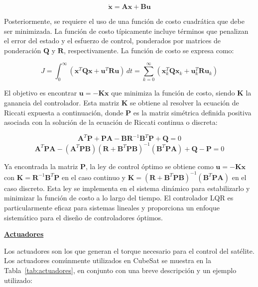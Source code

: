 \[
\dot{\mathbf{x}} = \mathbf{A} \mathbf{x} + \mathbf{B} \mathbf{u}
\]

Posteriormente, se requiere el uso de una función de costo cuadrática que debe ser minimizada. La función de costo típicamente incluye términos que penalizan el error del estado y el esfuerzo de control, ponderados por matrices de ponderación \( \mathbf{Q} \) y \( \mathbf{R} \), respectivamente. La función de costo se expresa como:

\[
J = \int_{0}^{\infty} \left( \mathbf{x}^T \mathbf{Q} \mathbf{x} + \mathbf{u}^T \mathbf{R} \mathbf{u} \right) \, dt = \sum_{k=0}^{\infty} \left( \mathbf{x}_k^T \mathbf{Q} \mathbf{x}_k + \mathbf{u}_k^T \mathbf{R} \mathbf{u}_k \right)
\]

El objetivo es encontrar \( \mathbf{u} = -\mathbf{K} \mathbf{x} \) que minimiza la función de costo, siendo \( \mathbf{K} \) la ganancia del controlador. Esta matriz \( \mathbf{K} \) se obtiene al resolver la ecuación de Riccati expuesta a continuación, donde \( \mathbf{P} \) es la matriz simétrica definida positiva asociada con la solución de la ecuación de Riccati continua o discreta:

\[
\mathbf{A}^T \mathbf{P} + \mathbf{P} \mathbf{A} - \mathbf{B} \mathbf{R}^{-1} \mathbf{B}^T \mathbf{P} + \mathbf{Q} = 0
\]
\[
\mathbf{A}^T \mathbf{P} \mathbf{A} - (\mathbf{A}^T \mathbf{P} \mathbf{B})(\mathbf{R} + \mathbf{B}^T \mathbf{P} \mathbf{B})^{-1}(\mathbf{B}^T \mathbf{P} \mathbf{A}) + \mathbf{Q} - \mathbf{P} = 0
\]

Ya encontrada la matriz \( \mathbf{P} \), la ley de control óptimo se obtiene como \( \mathbf{u} = -\mathbf{K} \mathbf{x} \) con \( \mathbf{K} = \mathbf{R}^{-1} \mathbf{B}^T \mathbf{P} \) en el caso continuo y \( \mathbf{K} = (\mathbf{R}+ \mathbf{B}^T \mathbf{P} \mathbf{B})^{-1}(\mathbf{B}^T\mathbf{P}\mathbf{A}) \) en el caso discreto. Esta ley se implementa en el sistema dinámico para estabilizarlo y minimizar la función de costo a lo largo del tiempo. El controlador LQR es particularmente eficaz para sistemas lineales y proporciona un enfoque sistemático para el diseño de controladores óptimos.

\textbf{\underline{Actuadores}}

Los actuadores son los que generan el torque necesario para el control del satélite. Los actuadores comúnmente utilizados en CubeSat se muestra en la Tabla~\ref{tab:actuadores}, en conjunto con una breve descripción y un ejemplo utilizado:

